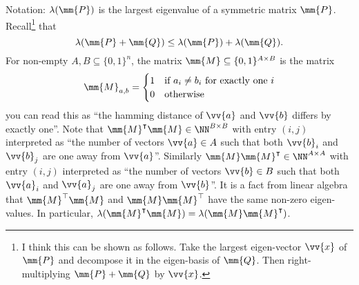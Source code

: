 Notation: $\lambda(\mm{P})$ is the largest eigenvalue of a symmetric matrix $\mm{P}$. Recall\footnote{I think this can be shown as follows. Take the largest eigen-vector $\vv{x}$ of $\mm{P}$ and decompose it in the eigen-basis of $\mm{Q}$. Then right-multiplying $\mm{P} + \mm{Q}$ by $\vv{x}$.} that 
\[\lambda(\mm{P} + \mm{Q}) \leq \lambda(\mm{P}) + \lambda(\mm{Q}).\]
For non-empty $A, B \subseteq \{0,1\}^n$, the matrix $\mm{M} \subseteq \{0,1\}^{A\times B}$ is the matrix 
\[\mm{M}_{a,b} = \begin{cases}
1 &\mbox{if $a_i \neq b_i$ for exactly one $i$}\\
0 &\mbox{otherwise}
\end{cases}\]
you can read this as ``the hamming distance of $\vv{a}$ and $\vv{b}$ differs by exactly one''. Note that $\mm{M}^{\intercal}\mm{M} \in \NN^{B \times B}$ with entry $(i,j)$ interpreted as ``the number of vectors $\vv{a} \in A$ such that both $\vv{b}_i$ and $\vv{b}_j$ are one away from $\vv{a}$''. Similarly $\mm{M}\mm{M}^{\intercal} \in \NN^{A \times A}$ with entry $(i,j)$ interpreted as ``the number of vectors $\vv{b} \in B$ such that both $\vv{a}_i$ and $\vv{a}_j$ are one away from $\vv{b}$''. It is a fact from linear algebra that $\mm{M}^{\top}\mm{M}$ and $\mm{M}\mm{M}^{\top}$ have the same non-zero eigen-values. In particular,  $\lambda(\mm{M}^{\intercal}\mm{M}) = \lambda(\mm{M}\mm{M}^{\intercal})$.

